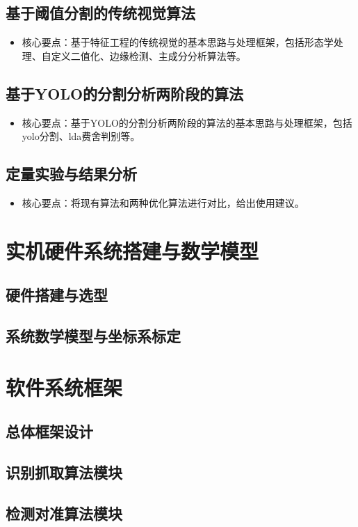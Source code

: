 \documentclass{Diploma}
\begin{document}
\subsection{基于阈值分割的传统视觉算法}
\begin{itemize}
  \item 核心要点：基于特征工程的传统视觉的基本思路与处理框架，包括形态学处理、自定义二值化、边缘检测、主成分分析算法等。
\end{itemize}
\subsection{基于YOLO的分割分析两阶段的算法}
\begin{itemize}
  \item 核心要点：基于YOLO的分割分析两阶段的算法的基本思路与处理框架，包括yolo分割、lda费舍判别等。
\end{itemize}
\subsection{定量实验与结果分析}
\begin{itemize}
  \item 核心要点：将现有算法和两种优化算法进行对比，给出使用建议。
\end{itemize}
\section{实机硬件系统搭建与数学模型}
\subsection{硬件搭建与选型}
\subsection{系统数学模型与坐标系标定}
\section{软件系统框架}
\subsection{总体框架设计}
\subsection{识别抓取算法模块}
\subsection{检测对准算法模块}
\end{document}

